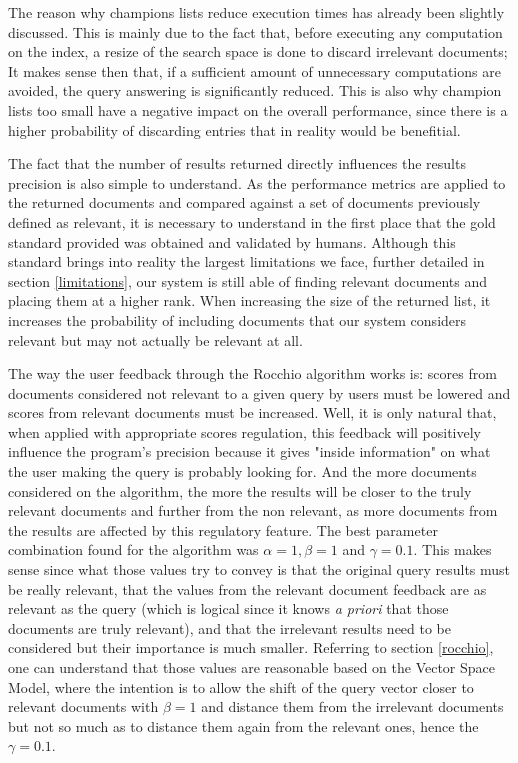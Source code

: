 \documentclass[12pt]{article}
\begin{document}
The reason why champions lists reduce execution times has already been slightly 
discussed. 
This is mainly due to the fact that, before executing any computation on the index,
a resize of the search space is done to discard irrelevant documents;
It makes sense then that, if a sufficient amount of unnecessary computations are 
avoided, the query answering is significantly reduced.
This is also why champion lists too small have a negative impact on the overall 
performance, since there is a higher probability of discarding entries that in 
reality would be benefitial.

The fact that the number of results returned directly influences the results 
precision is also simple to understand.
As the performance metrics are applied to the returned documents and compared 
against a set of documents previously defined as relevant, it is necessary to 
understand in the first place that the gold standard provided was obtained and 
validated by humans. 
Although this standard brings into reality the largest limitations we face, further 
detailed in section \ref{limitations}, our system is still able of finding relevant 
documents and placing them at a higher rank. 
When increasing the size of the returned list, it increases the probability of 
including documents that our system considers relevant but may not actually be 
relevant at all.

The way the user feedback through the Rocchio algorithm works is: scores from 
documents considered not relevant to a given query by users must be lowered and 
scores from relevant documents must be increased.
Well, it is only natural that, when applied with appropriate scores regulation,
this feedback will positively influence the program's precision because it gives
"inside information" on what the user making the query is probably looking for.
And the more documents considered on the algorithm, the more the results will 
be closer to the truly relevant documents and further from the non relevant, as 
more documents from the results are affected by this regulatory feature.
The best parameter combination found for the algorithm was $\alpha=1, \beta=1$ and $\gamma=0.1$. 
This makes sense since what those values try to convey is that the original query 
results must be really relevant, that the values from the relevant document 
feedback are as relevant as the query (which is logical since it knows 
\textit{a priori} that those documents are truly relevant), and that the irrelevant 
results need to be considered but their importance is much smaller.
Referring to section \ref{rocchio}, one can understand that those values are 
reasonable based on the Vector Space Model, where the intention is to allow the 
shift of the query vector closer to relevant documents with $\beta=1$ and distance 
them from the irrelevant documents but not so much as to distance them again 
from the relevant ones, hence the $\gamma=0.1$.
\end{document}
